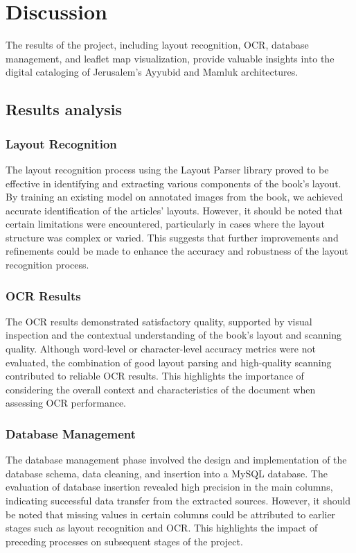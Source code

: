 \section{Discussion}

The results of the project, including layout recognition, OCR, database management, and leaflet map visualization, provide valuable insights into the digital cataloging of Jerusalem's Ayyubid and Mamluk architectures.
\subsection{Results analysis}
\subsubsection{Layout Recognition}

The layout recognition process using the Layout Parser library proved to be effective in identifying and extracting various components of the book's layout. By training an existing model on annotated images from the book, we achieved accurate identification of the articles' layouts. However, it should be noted that certain limitations were encountered, particularly in cases where the layout structure was complex or varied. This suggests that further improvements and refinements could be made to enhance the accuracy and robustness of the layout recognition process.

\subsubsection{OCR Results}

The OCR results demonstrated satisfactory quality, supported by visual inspection and the contextual understanding of the book's layout and scanning quality. Although word-level or character-level accuracy metrics were not evaluated, the combination of good layout parsing and high-quality scanning contributed to reliable OCR results. This highlights the importance of considering the overall context and characteristics of the document when assessing OCR performance.

\subsubsection{Database Management}

The database management phase involved the design and implementation of the database schema, data cleaning, and insertion into a MySQL database. The evaluation of database insertion revealed high precision in the main columns, indicating successful data transfer from the extracted sources. However, it should be noted that missing values in certain columns could be attributed to earlier stages such as layout recognition and OCR. This highlights the impact of preceding processes on subsequent stages of the project.

